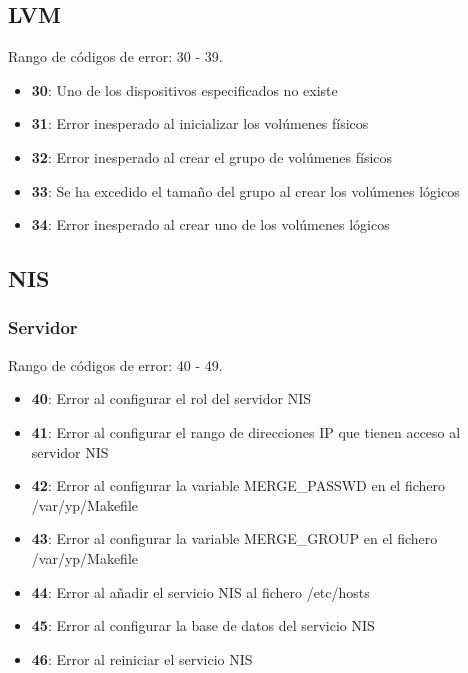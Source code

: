 \documentclass[12pt,a4paper, spanish]{article}
\begin{document}
\subsection{LVM}
Rango de códigos de error: 30 - 39.
\begin{itemize}
\item \textbf{30}: Uno de los dispositivos especificados no existe
\item \textbf{31}: Error inesperado al inicializar los volúmenes físicos
\item \textbf{32}: Error inesperado al crear el grupo de volúmenes físicos
\item \textbf{33}: Se ha excedido el tamaño del grupo al crear los volúmenes lógicos
\item \textbf{34}: Error inesperado al crear uno de los volúmenes lógicos
\end{itemize}

\subsection{NIS}

\subsubsection{Servidor}
Rango de códigos de error: 40 - 49.
\begin{itemize}
  \item \textbf{40}: Error al configurar el rol del servidor NIS
  \item \textbf{41}: Error al configurar el rango de direcciones IP que tienen acceso al servidor NIS
  \item \textbf{42}: Error al configurar la variable MERGE\_PASSWD en el fichero /var/yp/Makefile
  \item \textbf{43}: Error al configurar la variable MERGE\_GROUP en el fichero /var/yp/Makefile
  \item \textbf{44}: Error al añadir el servicio NIS al fichero /etc/hosts
  \item \textbf{45}: Error al configurar la base de datos del servicio NIS
  \item \textbf{46}: Error al reiniciar el servicio NIS
\end{itemize}
\end{document}
